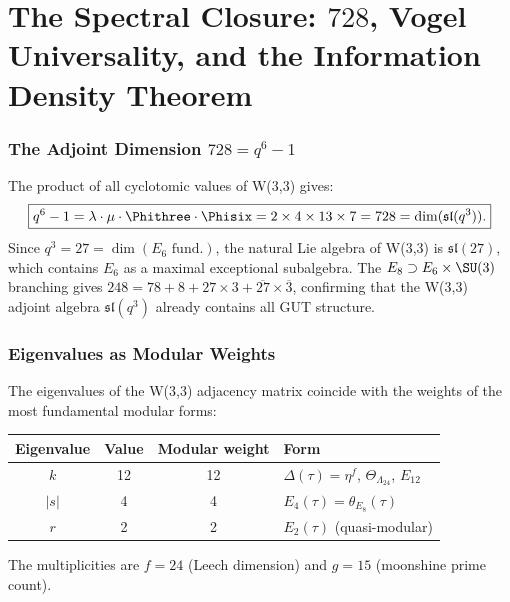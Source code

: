 \clearpage
\part{\texorpdfstring{The Spectral Closure: $728$, Vogel Universality, and the Information Density Theorem}{The Spectral Closure: 728, Vogel Universality, and the Information Density Theorem}}

\section{\texorpdfstring{The Adjoint Dimension $728 = q^6 - 1$}{The Adjoint Dimension 728 = q^6 - 1}}

The product of all cyclotomic values of W(3,3) gives:
\begin{equation}
\boxed{q^6-1 = \lambda\cdot\mu\cdot\Phithree\cdot\Phisix = 2\times 4\times 13\times 7 = 728 = \dim(\mathfrak{sl}(q^3)).}
\end{equation}
Since $q^3 = 27 = \dim(E_6\text{ fund.})$, the natural Lie algebra of W(3,3)
is $\mathfrak{sl}(27)$, which contains $E_6$ as a maximal exceptional subalgebra.
The $E_8\supset E_6\times\SU(3)$ branching gives
$248 = 78 + 8 + 27\times 3 + \overline{27}\times\overline{3}$,
confirming that the W(3,3) adjoint algebra $\mathfrak{sl}(q^3)$
already contains all GUT structure.

\section{Eigenvalues as Modular Weights}

The eigenvalues of the W(3,3) adjacency matrix coincide with the
weights of the most fundamental modular forms:
\begin{center}
\begin{tabular}{@{}cccl@{}}
\toprule
Eigenvalue & Value & Modular weight & Form \\
\midrule
$k$ & 12 & 12 & $\Delta(\tau)=\eta^f$, $\Theta_{\Lambda_{24}}$, $E_{12}$ \\
$|s|$ & 4 & 4 & $E_4(\tau) = \theta_{E_8}(\tau)$ \\
$r$ & 2 & 2 & $E_2(\tau)$ (quasi-modular) \\
\bottomrule
\end{tabular}
\end{center}
The multiplicities are $f=24$ (Leech dimension) and $g=15$
(moonshine prime count).

